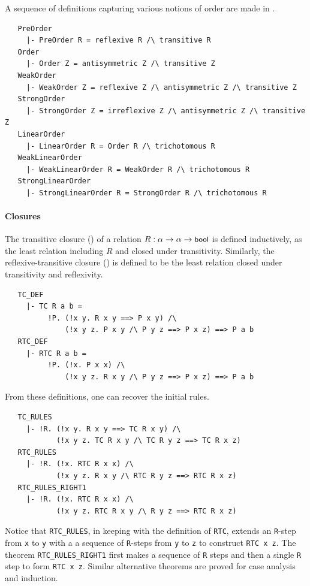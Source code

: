 {A sequence of definitions capturing various notions of order are made
in .
%
\begin{hol}
\begin{verbatim}
   PreOrder
     |- PreOrder R = reflexive R /\ transitive R
   Order
     |- Order Z = antisymmetric Z /\ transitive Z
   WeakOrder
     |- WeakOrder Z = reflexive Z /\ antisymmetric Z /\ transitive Z
   StrongOrder
     |- StrongOrder Z = irreflexive Z /\ antisymmetric Z /\ transitive Z
   LinearOrder
     |- LinearOrder R = Order R /\ trichotomous R
   WeakLinearOrder
     |- WeakLinearOrder R = WeakOrder R /\ trichotomous R
   StrongLinearOrder
     |- StrongLinearOrder R = StrongOrder R /\ trichotomous R
\end{verbatim}
\end{hol}

\paragraph {Closures}

The transitive closure () of a relation $R : \alpha
\to\alpha\to\mbox{\small{\textbf{\sf{bool}}}}$ is defined inductively, as the least
relation including $R$ and closed under transitivity. Similarly, the
reflexive-transitive closure () is defined to be the least
relation closed under transitivity and reflexivity.
%
\begin{hol}
\begin{verbatim}
   TC_DEF
     |- TC R a b =
          !P. (!x y. R x y ==> P x y) /\
              (!x y z. P x y /\ P y z ==> P x z) ==> P a b
   RTC_DEF
     |- RTC R a b =
          !P. (!x. P x x) /\
              (!x y z. R x y /\ P y z ==> P x z) ==> P a b
\end{verbatim}
\end{hol}

\noindent
From these definitions, one can recover the initial rules.
%
\begin{hol}
\begin{verbatim}
   TC_RULES
     |- !R. (!x y. R x y ==> TC R x y) /\
            (!x y z. TC R x y /\ TC R y z ==> TC R x z)
   RTC_RULES
     |- !R. (!x. RTC R x x) /\
            (!x y z. R x y /\ RTC R y z ==> RTC R x z)
   RTC_RULES_RIGHT1
     |- !R. (!x. RTC R x x) /\
            (!x y z. RTC R x y /\ R y z ==> RTC R x z)
\end{verbatim}
\end{hol}
%
Notice that {\small\verb+RTC_RULES+}, in keeping with the definition
of {\small\verb+RTC+}, extends an \verb+R+-step from \verb+x+ to
\verb+y+ with a a sequence of \verb+R+-steps from \verb+y+ to \verb+z+
to construct \verb+RTC x z+. The theorem
{\small\verb+RTC_RULES_RIGHT1+} first makes a sequence of \verb+R+
steps and then a single \verb+R+ step to form \verb+RTC x z+. Similar
alternative theorems are proved for case analysis and induction.

}
